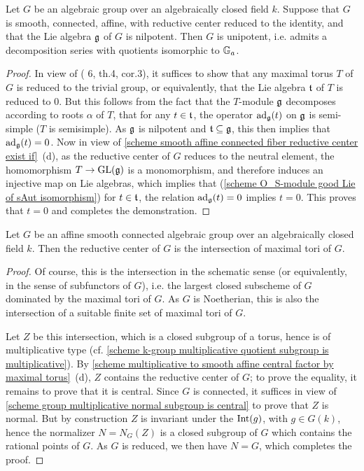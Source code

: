 \begin{corollary}\label{scheme alg group reductive center trivial and nilpotent Lie alg is unipotent}
Let $G$ be an algebraic group over an algebraically closed field $k$. Suppose that $G$ is smooth, connected, affine, with reductive center reduced to the identity, and that the Lie algebra $\mathfrak{g}$ of $G$ is nilpotent. Then $G$ is unipotent, i.e. admits a decomposition series with quotients isomorphic to $\mathbb{G}_a$.
\end{corollary}
\begin{proof}
In view of (\cite{Chevalley1958} 6, th.4, cor.3), it suffices to show that any maximal torus $T$ of $G$ is reduced to the trivial group, or equivalently, that the Lie algebra $\mathfrak{t}$ of $T$ is reduced to $0$. But this follows from the fact that the $T$-module $\mathfrak{g}$ decomposes according to roots $\alpha$ of $T$, that for any $t\in\mathfrak{t}$, the operator $\mathrm{ad}_{\mathfrak{g}}(t)$ on $\mathfrak{g}$ is semi-simple ($T$ is semisimple). As $\mathfrak{g}$ is nilpotent and $\mathfrak{t}\subseteq\mathfrak{g}$, this then implies that $\mathrm{ad}_{\mathfrak{g}}(t)=0$. Now in view of \cref{scheme smooth affine connected fiber reductive center exist if}~(d), as the reductive center of $G$ reduces to the neutral element, the homomorphism $T\to\mathrm{GL}(\mathfrak{g})$ is a monomorphism, and therefore induces an injective map on Lie algebras, which implies that (\cref{scheme O_S-module good Lie of sAut isomorphism}) for $t\in\mathfrak{t}$, the relation $\mathrm{ad}_{\mathfrak{g}}(t)=0$ implies $t=0$. This proves that $t=0$ and completes
the demonstration.
\end{proof}

\begin{proposition}\label{scheme alg group reductive center is intersection of maximal tori}
Let $G$ be an affine smooth connected algebraic group over an algebraically closed field $k$. Then the reductive center of $G$ is the intersection of maximal tori of $G$.
\end{proposition}
\begin{proof}
Of course, this is the intersection in the schematic sense (or equivalently, in the sense of subfunctors of $G$), i.e. the largest closed subscheme of $G$ dominated by the maximal tori of $G$. As $G$ is Noetherian, this is also the intersection of a suitable finite set of maximal tori of $G$.\par
Let $Z$ be this intersection, which is a closed subgroup of a torus, hence is of multiplicative type (cf. \cref{scheme k-group multiplicative quotient subgroup is multiplicative}). By \cref{scheme multiplicative to smooth affine central factor by maximal torus}~(d), $Z$ contains the reductive center of $G$; to prove the equality, it remains to prove that it is central. Since $G$ is connected, it suffices in view of \cref{scheme group multiplicative normal subgroup is central} to prove that $Z$ is normal. But by construction $Z$ is invariant under the $\operatorname{Int}(g)$, with $g\in G(k)$, hence the normalizer $N=N_G(Z)$ is a closed subgroup of $G$ which contains the rational points of $G$. As $G$ is reduced, we then have $N=G$, which completes the proof.
\end{proof}

